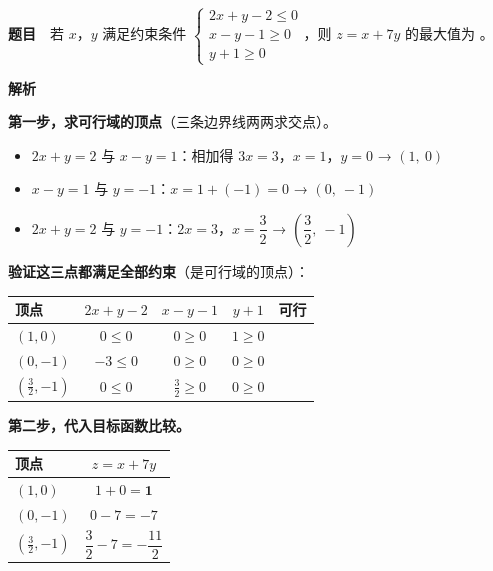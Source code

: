 \par\medskip



\textbf{题目}　若 $x$，$y$ 满足约束条件 $\begin{cases}2x+y-2\le0\\ x-y-1\ge0\\ y+1\ge0\end{cases}$，则 $z=x+7y$ 的最大值为 \gkblank{}。

\textbf{解析}

\textbf{第一步，求可行域的顶点}（三条边界线两两求交点）。

\begin{itemize}
\item $2x+y=2$ 与 $x-y=1$：相加得 $3x=3$，$x=1$，$y=0$ → $(1,\ 0)$
\item $x-y=1$ 与 $y=-1$：$x=1+(-1)=0$ → $(0,\ -1)$
\item $2x+y=2$ 与 $y=-1$：$2x=3$，$x=\dfrac32$ → $\left(\dfrac32,\ -1\right)$
\end{itemize}

\textbf{验证这三点都满足全部约束}（是可行域的顶点）：

\begin{center}
\begin{tabular}{lcccc}
\toprule
顶点 & $2x+y-2$ & $x-y-1$ & $y+1$ & 可行 \\
\midrule
$(1,0)$ & $0\le0$  & $0\ge0$  & $1\ge0$  &  \\
$(0,-1)$ & $-3\le0$  & $0\ge0$  & $0\ge0$  &  \\
$\left(\frac32,-1\right)$ & $0\le0$  & $\frac32\ge0$  & $0\ge0$  &  \\
\bottomrule
\end{tabular}
\end{center}

\textbf{第二步，代入目标函数比较。}

\begin{center}
\begin{tabular}{lc}
\toprule
顶点 & $z=x+7y$ \\
\midrule
$(1,0)$ & $1+0=\mathbf 1$ \\
$(0,-1)$ & $0-7=-7$ \\
$\left(\frac32,-1\right)$ & $\dfrac32-7=-\dfrac{11}2$ \\
\bottomrule
\end{tabular}
\end{center}

